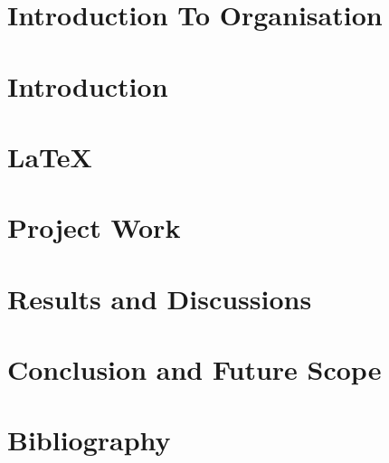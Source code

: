 \documentclass[12pt, a4paper]{article}
\begin{document}

\footskip 0.7cm
\thispagestyle{empty} 

\newpage
\cfoot{\thepage}

\newpage


\newpage
\tableofcontents

\newpage
\listoffigures

\newpage
{}
\cfoot{\thepage}

\newpage
\section{Introduction To Organisation}


\newpage
\section{Introduction}


\newpage
\section{\LaTeX}


\newpage
\section{Project Work}


\newpage
\section{Results and Discussions}


\newpage
\section{Conclusion and Future Scope}


\newpage
\section{Bibliography}

\end{document}
